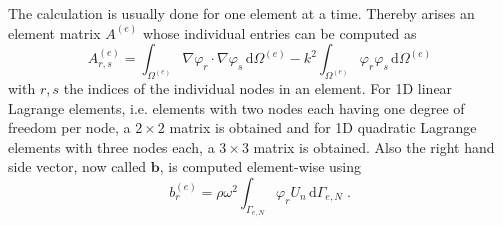 \documentclass[%
  a4paper,oneside,%
  11pt,%
  smallchapters,
  style=printdev,
  extramargin,
  green,%
  rgb, <cmyk>
  ]{tubsbook}
\begin{document}
The calculation is usually done for one element at a time. Thereby arises an element matrix $A^{(e)}$ whose individual entries can be computed as
\begin{equation}
A_{r,s}^{(e)} = \int_{\Omega^{(e)}} \nabla \varphi_r \cdot \nabla \varphi_s \, \mathrm{d}\Omega^{(e)} - k^2 \int_{\Omega^{(e)}} \varphi_r \varphi_s \, \mathrm{d}\Omega^{(e)}
\end{equation}
with $r,s$ the indices of the individual nodes in an element. For 1D linear Lagrange elements, i.e. elements with two nodes each having one degree of freedom per node, a $2\times 2$ matrix is obtained and for 1D quadratic Lagrange elements with three nodes each, a $3\times3$ matrix is obtained.
%
Also the right hand side vector, now called $\bm{b}$, is computed element-wise using
\begin{equation}
b_r^{(e)} = \rho \omega^2  \int_{\Gamma_{e,N}} \varphi_r U_n \,\mathrm{d}\Gamma_{e,N} \;.
\end{equation}
\end{document}
